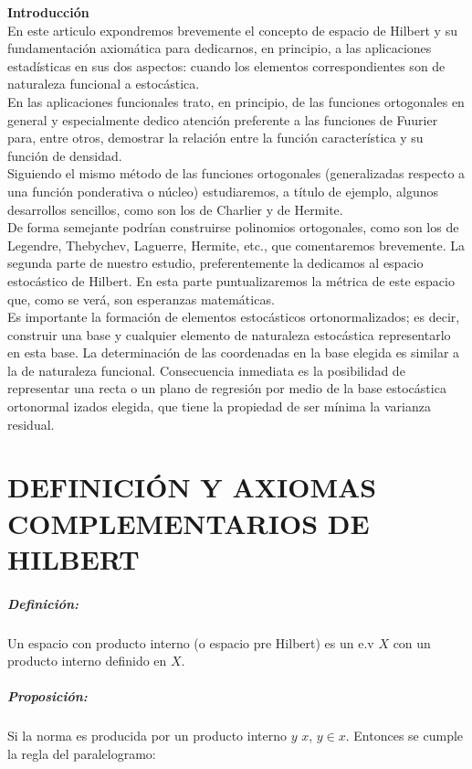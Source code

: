 {\Large \bf Introducción}\\

En este articulo expondremos brevemente el concepto de espacio de Hilbert y su fundamentación axiomática para dedicarnos, en principio, a las aplicaciones estadísticas en sus dos aspectos: cuando los elementos correspondientes son de naturaleza funcional a estocástica.
\\

En las aplicaciones funcionales trato, en principio, de las funciones ortogonales en
general y especialmente dedico atención preferente a las funciones de Fuurier para,
entre otros, demostrar la relación entre la función característica y su función de
densidad.
\\

Siguiendo el mismo método de las funciones ortogonales (generalizadas respecto a una función ponderativa o núcleo) estudiaremos, a título de ejemplo, algunos desarrollos sencillos, como son los de Charlier y de Hermite.
\\

De forma semejante podrían construirse polinomios ortogonales, como son los de
Legendre, Thebychev, Laguerre, Hermite, etc., que comentaremos brevemente.
La segunda parte de nuestro estudio, preferentemente la dedicamos al espacio
estocástico de Hilbert. En esta parte puntualizaremos la métrica de este espacio que,
como se verá, son esperanzas matemáticas.
\\

Es importante la formación de elementos estocásticos ortonormalizados; es decir,
construir una base y cualquier elemento de naturaleza estocástica representarlo en esta
base. La determinación de las coordenadas en la base elegida es similar a la de
naturaleza funcional. Consecuencia inmediata es la posibilidad de representar una recta
o un plano de regresión por medio de la base estocástica ortonormal izados elegida, que
tiene la propiedad de ser mínima la varianza residual.
\\

\section{DEFINICIÓN Y AXIOMAS COMPLEMENTARIOS DE HILBERT}

\subparagraph{Definición:}
Un espacio con producto interno (o espacio  pre Hilbert) es un e.v  $ X $ con un producto interno definido en $X$.
\subparagraph{Proposición:} Si la norma es producida por un producto interno $y$ $x$, $ y \in x$. Entonces se cumple la regla del paralelogramo: 

